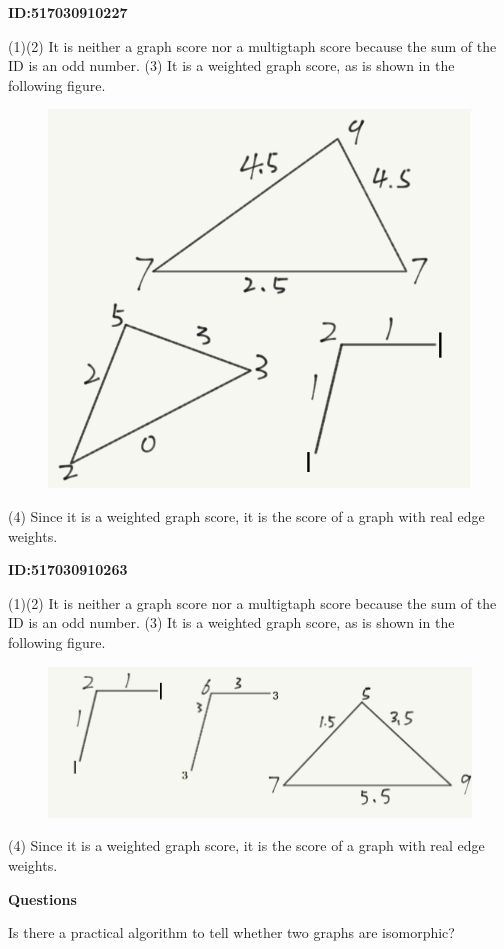 \documentclass{article} %
\begin{document}
	\textbf{ID:517030910227}\par
	(1)(2) It is neither a graph score nor a multigtaph score because the sum of the ID is an odd number.
	(3) It is a weighted graph score, as is shown in the following figure.
	
	\begin{figure}[H]
		\centering
		\includegraphics[scale=0.6]{10227.png}
		\caption{}
		\label{fig:4}
	\end{figure}
	(4) Since it is a weighted graph score, it is the score of a graph with real edge weights.

	\textbf{ID:517030910263}\par
	(1)(2) It is neither a graph score nor a multigtaph score because the sum of the ID is an odd number.
	(3) It is a weighted graph score, as is shown in the following figure.
	
	\begin{figure}[H]
		\centering
		\includegraphics[scale=0.6]{10263.png}
		\caption{}
		\label{fig:5}
	\end{figure}
	(4) Since it is a weighted graph score, it is the score of a graph with real edge weights.

	\textbf{Questions}\par
	Is there a practical algorithm to tell whether two graphs are isomorphic?
\end{document}
